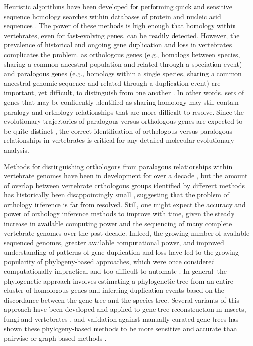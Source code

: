 Heuristic algorithms have been developed for performing quick and
sensitive sequence homology searches within databases of protein and
nucleic acid sequences \citep{Altschul1997,Eddy2009}. The power of
these methods is high enough that homology within vertebrates, even
for fast-evolving genes, can be readily detected. However, the
prevalence of historical and ongoing gene duplication and loss in
vertebrates complicates the problem, as orthologous genes (e.g.,
homologs between species, sharing a common ancestral population and
related through a speciation event) and paralogous genes (e.g.,
homologs within a single species, sharing a common ancestral genomic
sequence and related through a duplication event) are important, yet
difficult, to distinguish from one another \citep{Jun2009}. In other
words, sets of genes that may be confidently identified as sharing
homology may still contain paralogy and orthology relationships that
are more difficult to resolve. Since the evolutionary trajectories of
paralogous versus orthologous genes are expected to be quite distinct
\citep{Lynch2000}, the correct identification of orthologous versus
paralogous relationships in vertebrates is critical for any detailed
molecular evolutionary analysis.

Methods for distinguishing orthologous from paralogous relationships
within vertebrate genomes have been in development for over a decade
\citep{Remm2001,Yuan1998}, but the amount of overlap between
vertebrate orthologous groups identified by different methods has
historically been disappointingly small \citep{Jun2009,Chen2007},
suggesting that the problem of orthology inference is far from
resolved. Still, one might expect the accuracy and power of orthology
inference methods to improve with time, given the steady increase in
available computing power and the sequencing of many complete
vertebrate genomes over the past decade. Indeed, the growing number of
available sequenced genomes, greater available computational power,
and improved understanding of patterns of gene duplication and loss
have led to the growing popularity of phylogeny-based approaches,
which were once considered computationally impractical and too
difficult to automate \citep{Remm2001}. In general, the phylogenetic
approach involves estimating a phylogenetic tree from an entire
cluster of homologous genes and inferring duplication events based on
the discordance between the gene tree and the species tree. Several
variants of this approach have been developed and applied to gene tree
reconstruction in insects, fungi and vertebrates
\citep{Muller2010a,Cepas2007,Datta2009,Vilella2009,Ruan2008,Hahn2007a},
and validation against manually-curated gene trees has shown these
phylogeny-based methods to be more sensitive and accurate than
pairwise or graph-based methods \citep{Datta2009}.

